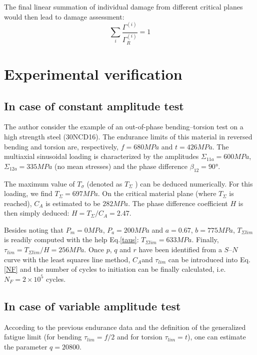 \documentclass[3p,times,procedia,number]{elsarticle}
\begin{document}
\begin{flushleft}
The final linear summation of individual damage from different
critical planes would then lead to damage assessment:
\begin{equation}
\sum_{i}^{}\frac{\Gamma^{(i)}}{\Gamma_R^{(i)}}=1
\label{damage}
\end{equation}

\end{flushleft}

\section{Experimental verification}
\subsection{In case of constant amplitude test }
The author \cite{FFE:FFE452} consider the example of an out-of-phase bending–torsion test on a high strength steel (30NCD16). The endurance limits of this material in reversed
bending and torsion are, respectively, $f=680 MPa$ and $t=426 MPa$.  The multiaxial sinusoidal loading is characterized by the amplitudes $\Sigma_{11a} =600 MPa$, $\Sigma_{12a} =335 MPa$ (no mean stresses)
and the phase difference $\beta_{12} =90°$.

The maximum value of $T_\sigma$ (denoted as $T_\Sigma$ ) can be deduced numerically. For this loading, we find $T_\Sigma=697 MPa$. On the critical material
plane (where $T_\Sigma$ is reached), $C_A$ is estimated to be $282 MPa$. The phase difference coefficient $H$ is
then simply deduced: $H=T_\Sigma /C_A =2.47$.

Besides noting that $P_m =0 MPa$, $P_a=200 MPa$ and $a=0.67$, $b=775 MPa$, $T_{\Sigma lim}$ is readily
computed with the help Eq.\eqref{taus}: $T_{\Sigma lim} =633 MPa$. Finally, $\tau_{lim} =T_{\Sigma lim} /H=256 MPa$. Once $p$, $q$ and $r$ have been identified from a $S–N$ curve with the least squares line method, $C_A $and $\tau_{lim}$ can
be introduced into Eq. \eqref{NF} and the number of cycles to initiation can be finally calculated, i.e.
$N_F =2×10^5$ cycles.

\subsection{In case of variable amplitude test }

 
 According to the previous endurance data and the
 definition of the generalized fatigue limit (for bending
 $\tau_{lim} =f/2$ and for torsion $\tau_{lim}=t$), one can estimate the parameter $q=20 800$.
 
\end{document}
